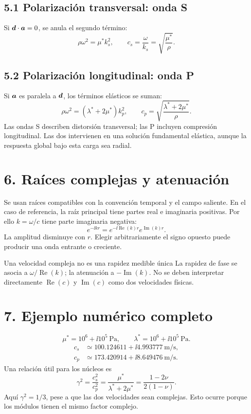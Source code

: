 \documentclass[11pt]{article}
\begin{document}
\subsection*{5.1 Polarización transversal: onda S}
Si \(\bm{d}\cdot\bm{a}=0\), se anula el segundo término:
\[
 \rho\omega^2=\mu^*k_s^2,\qquad
 \boxed{c_s=\frac{\omega}{k_s}=\sqrt{\frac{\mu^*}{\rho}}.}
\]
\subsection*{5.2 Polarización longitudinal: onda P}
Si \(\bm{a}\) es paralela a \(\bm{d}\), los términos elásticos se suman:
\[
 \rho\omega^2=(\lambda^*+2\mu^*)k_p^2,\qquad
 \boxed{c_p=\sqrt{\frac{\lambda^*+2\mu^*}{\rho}}.}
\]
Las ondas S describen distorsión transversal; las P incluyen compresión
longitudinal. Las dos intervienen en una solución fundamental elástica,
aunque la respuesta global bajo esta carga sea radial.

\section*{6. Raíces complejas y atenuación}
Se usan raíces compatibles con la convención temporal y el campo saliente.
En el caso de referencia, la raíz principal tiene partes real e imaginaria
positivas. Por ello \(k=\omega/c\) tiene parte imaginaria negativa:
\[
 e^{-\ii kr}=e^{-\ii\operatorname{Re}(k)r}
              e^{\operatorname{Im}(k)r}.
\]
La amplitud disminuye con \(r\). Elegir arbitrariamente el signo opuesto
puede producir una onda entrante o creciente.

\begin{alerta}{Una velocidad compleja no es una rapidez medible única}
La rapidez de fase se asocia a \(\omega/\operatorname{Re}(k)\); la atenuación
a \(-\operatorname{Im}(k)\). No se deben interpretar directamente
\(\operatorname{Re}(c)\) y \(\operatorname{Im}(c)\) como dos velocidades físicas.
\end{alerta}

\newpage
\section*{7. Ejemplo numérico completo}
\[
 \mu^*=10^6+\ii10^5\ \mathrm{Pa},\qquad
 \lambda^*=10^6+\ii10^5\ \mathrm{Pa}.
\]
\[
 \begin{aligned}
 c_s&\simeq100.124611+\ii4.993777\ \mathrm{m/s},\\
 c_p&\simeq173.420914+\ii8.649476\ \mathrm{m/s}.
 \end{aligned}
\]
Una relación útil para los núcleos es
\[
 \gamma^2=\frac{c_s^2}{c_p^2}
 =\frac{\mu^*}{\lambda^*+2\mu^*}
 =\frac{1-2\nu}{2(1-\nu)}.
\]
Aquí \(\gamma^2=1/3\), pese a que las dos velocidades sean complejas.
Esto ocurre porque los módulos tienen el mismo factor complejo.
\end{document}

